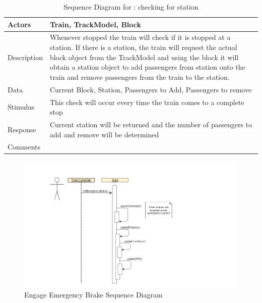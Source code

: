 \documentclass[]{article}
\begin{document}
\begin{table}[H]
	\centering
	\caption{Sequence Diagram for : checking for station}
	\begin{tabular}{|l|l|}
		\hline
		Actors & \parbox[t]{10cm}{Train, TrackModel, Block} \\ \hline
		Description & \parbox[t]{10cm}{Whenever stopped the train will check if it is stopped at a station. If there is a station, the train will request the actual block object from the TrackModel and using the block it will obtain a station object to add passengers from station onto the train and remove passengers from the train to the station.} \\ \hline
		Data &  \parbox[t]{10cm}{Current Block, Station, Passengers to Add, Passengers to remove} \\ \hline
		Stimulus &  \parbox[t]{10cm}{This check will occur every time the train comes to a complete stop} \\ \hline
		Response & \parbox[t]{10cm}{Current station will be returned and the number of passengers to add and remove will be determined}\\ \hline
		Comments & \parbox[t]{10cm}{ }  \\ \hline
	\end{tabular}
\end{table}

\begin{figure}[H]
	\centering
	\includegraphics[scale=.5]{train_model_sqd_engage_emergency_brake.png}
	\caption{Engage Emergency Brake Sequence Diagram}
\end{figure}
\end{document}
